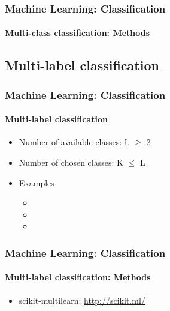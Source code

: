 \documentclass[xcolor=table]{beamer}
\begin{document}
\begin{frame}
	\frametitle{Machine Learning: Classification}
	\framesubtitle{Multi-class classification: Methods}
	
	
\end{frame}

\subsection{Multi-label classification}

\begin{frame}
	\frametitle{Machine Learning: Classification}
	\framesubtitle{Multi-label classification}
	
	\begin{minipage}{0.65\textwidth}
	\begin{itemize}
		\item Number of available classes: L $ \ge $ 2
		\item Number of chosen classes: K $ \le $ L
		\item Examples
		\begin{itemize}
			\item {}
			\item {}
			\item {}
		\end{itemize}
	\end{itemize}
	\end{minipage}
	\begin{minipage}{0.3\textwidth}
	\end{minipage}
	
\end{frame}

\begin{frame}
	\frametitle{Machine Learning: Classification}
	\framesubtitle{Multi-label classification: Methods \cite{2012-madjarov-al}}
	
	
	\begin{itemize}
		\item scikit-multilearn: \url{http://scikit.ml/}
	\end{itemize}
	
\end{frame}
\end{document}
